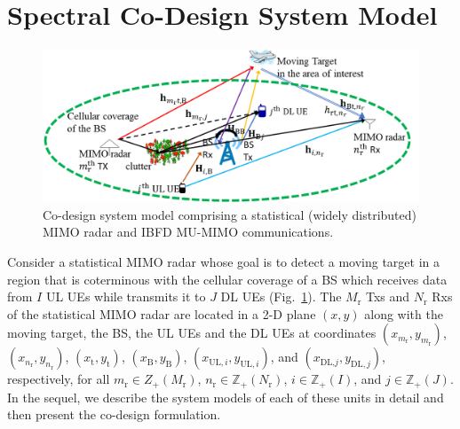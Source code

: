 \documentclass[10pt,journal]{IEEEtran}
\newcommand{\paren}[1]{\left({#1}\right)}
\theoremstyle{definition}
\begin{document}
\section{Spectral Co-Design System Model}
\label{sec:system}
 \begin{figure}[t]
	\centering
	\includegraphics[width=1\columnwidth]{setup_model_tsp.png}
	\caption{Co-design system model comprising a statistical (widely distributed) MIMO radar and IBFD MU-MIMO communications.}
	\label{fig:setup}
\end{figure}
Consider a statistical MIMO radar whose goal is to detect a moving target in a region that is coterminous with the cellular coverage of a BS which receives data from $\mathit{I}$ UL UEs while transmits it to $\mathit{J}$ DL UEs (Fig.~\ref{fig:setup}). %
The $M_\mathrm{r}$ Txs and $N_\mathrm{r}$ Rxs of the statistical MIMO radar are located in a 2-D plane $\left(x,y \right)$ along with the moving target, the BS, the UL UEs and the DL UEs at coordinates $\left(x_{m_\mathrm{r}},y_{m_\mathrm{r}}\right)$, $\left(x_{n_\mathrm{r}},y_{n_\mathrm{r}} \right)$, $(x_{\mathrm{t}},y_{\mathrm{t}})$, $(x_{\mathrm{B}},y_{\mathrm{B}})$, $(x_{\textrm{UL},i},y_{\textrm{UL},i})$, and $(x_{\textrm{DL,}j},y_{\textrm{DL},j})$, respectively, for all $m_\mathrm{r}\in{Z}_{+}(M_\mathrm{r})$, $n_\mathrm{r}\in\mathbb{Z}_{+}\paren{N_\mathrm{r}}$, $i\in\mathbb{Z}_{+}\paren{I}$, and $j\in\mathbb{Z}_{+}\paren{J}$. In the sequel, we describe the system models of each of these units in detail and then present the co-design formulation.
\end{document}
